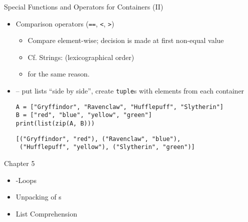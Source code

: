 
\begin{frame}[fragile]{Special Functions and Operators for Containers (II)}
%
\begin{itemize}
\item Comparison operators (\texttt{==}, \texttt{<}, \texttt{>})
	\begin{itemize}
	\item Compare element-wise; decision is made at first non-equal value
	\item Cf. Strings:  (lexicographical order)
	\item \inPy{[1, 5, 7] < [1, 5, 9, -3]} for the same reason.
	\end{itemize}
\item {} -- put lists \enquote{side by side}, create \texttt{tuple}s with elements from each container \\
	\begin{codebox}
	\begin{verbatim}
A = ["Gryffindor", "Ravenclaw", "Hufflepuff", "Slytherin"]
B = ["red", "blue", "yellow", "green"]
print(list(zip(A, B)))
	\end{verbatim}
	\end{codebox}
	\begin{cmdbox}
	\begin{verbatim}
[("Gryffindor", "red"), ("Ravenclaw", "blue"),
 ("Hufflepuff", "yellow"), ("Slytherin", "green")]
	\end{verbatim}
	\end{cmdbox}
\end{itemize}
%
\end{frame}


\begin{frame}{Chapter 5}
%
\begin{itemize}
\item {}-Loops
\item Unpacking of s
\item List Comprehension
\end{itemize}
%
\end{frame}


